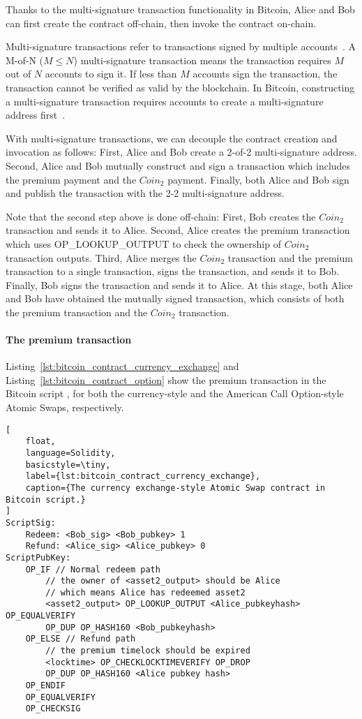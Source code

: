 Thanks to the multi-signature transaction functionality in Bitcoin,
Alice and Bob can first create the contract off-chain, then invoke the contract on-chain.

Multi-signature transactions refer to transactions signed by multiple accounts~\cite{okupski2014bitcoin}.
A M-of-N ($M \leq N$) multi-signature transaction means the transaction requires $M$ out of $N$ accounts to sign it.
If less than $M$ accounts sign the transaction, the transaction cannot be verified as valid by the blockchain.
In Bitcoin, constructing a multi-signature transaction requires accounts to create a multi-signature address first~\cite{okupski2014bitcoin}.

With multi-signature transactions, we can decouple the contract creation and invocation as follows:
First, Alice and Bob create a 2-of-2 multi-signature address. 
Second, Alice and Bob mutually construct and sign a transaction which includes the premium payment and the $Coin_2$ payment.
Finally, both Alice and Bob sign and publish the transaction with the 2-2 multi-signature address.

Note that the second step above is done off-chain:
First, Bob creates the $Coin_2$ transaction and sends it to Alice.
Second, Alice creates the premium transaction which uses OP\_LOOKUP\_OUTPUT to check the ownership of $Coin_2$ transaction outputs.
Third, Alice merges the $Coin_2$ transaction and the premium transaction to a single transaction, signs the transaction, and sends it to Bob.
Finally, Bob signs the transaction and sends it to Alice.
At this stage, both Alice and Bob have obtained the mutually signed transaction, which consists of both the premium transaction and the $Coin_2$ transaction.

\paragraph{The premium transaction}
Listing~\ref{lst:bitcoin_contract_currency_exchange} and Listing~\ref{lst:bitcoin_contract_option} show the premium transaction in the Bitcoin script
, for both the currency-style and the American Call Option-style Atomic Swaps, respectively.

\begin{lstlisting}[
    float,
    language=Solidity, 
    basicstyle=\tiny,
    label={lst:bitcoin_contract_currency_exchange},
    caption={The currency exchange-style Atomic Swap contract in Bitcoin script.}
]
ScriptSig:
    Redeem: <Bob_sig> <Bob_pubkey> 1
    Refund: <Alice_sig> <Alice_pubkey> 0
ScriptPubKey:
    OP_IF // Normal redeem path
        // the owner of <asset2_output> should be Alice
        // which means Alice has redeemed asset2
        <asset2_output> OP_LOOKUP_OUTPUT <Alice_pubkeyhash> OP_EQUALVERIFY 
        OP_DUP OP_HASH160 <Bob_pubkeyhash>
    OP_ELSE // Refund path
        // the premium timelock should be expired
        <locktime> OP_CHECKLOCKTIMEVERIFY OP_DROP
        OP_DUP OP_HASH160 <Alice pubkey hash>
    OP_ENDIF
    OP_EQUALVERIFY
    OP_CHECKSIG
\end{lstlisting}  


